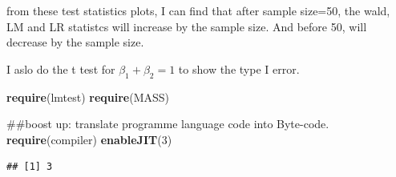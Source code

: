 \documentclass[]{article}
\newenvironment{Shaded}{\begin{snugshade}}{\end{snugshade}}
\newcommand{\KeywordTok}[1]{\textcolor[rgb]{0.13,0.29,0.53}{\textbf{{#1}}}}
\newcommand{\DecValTok}[1]{\textcolor[rgb]{0.00,0.00,0.81}{{#1}}}
\newcommand{\NormalTok}[1]{{#1}}
\begin{document}
from these test statistics plots, I can find that after sample size=50,
the wald, LM and LR statistcs will increase by the sample size. And
before 50, will decrease by the sample size.

I aslo do the t test for \(\beta_{1} + \beta_{2} = 1\) to show the type
I error.

\begin{Shaded}
\begin{Highlighting}[]
\KeywordTok{require}\NormalTok{(lmtest)}
\KeywordTok{require}\NormalTok{(MASS)}

\NormalTok{##boost up: translate programme language code into Byte-code.}
\KeywordTok{require}\NormalTok{(compiler)}
\KeywordTok{enableJIT}\NormalTok{(}\DecValTok{3}\NormalTok{)}
\end{Highlighting}
\end{Shaded}

\begin{verbatim}
## [1] 3
\end{verbatim}
\end{document}
